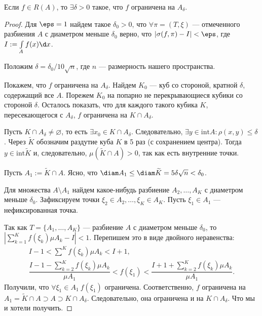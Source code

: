 \begin{Statement}
Если $f \in R(A)$, то $\exists \delta > 0$ такое, что $f$ ограничена на $A_\delta$.
\end{Statement}
\begin{proof}
Для $\eps = 1$ найдем такое $\delta_0 > 0$, что $\forall \pi = (T, \xi)$ --- отмеченного разбиения $A$ с диаметром меньше $\delta_0$ верно, что $|\sigma(f, \pi) - I | < \eps$, где $I := \int\limits_A f(x) \d x$.

Положим $\delta = \delta_0 / 10\sqrt{n}$, где $n$ --- размерность нашего пространства.

Покажем, что $f$ ограничена на $A_\delta$. Найдем $K_0$ --- куб со стороной, кратной $\delta$, содержащий все $A$. Порежем $K_0$ на попарно не перекрывающиеся кубики со стороной $\delta$. Осталось показать, что для каждого такого кубика $K$, пересекающегося с $A_\delta$, $f$ ограничена на $K \cap A_\delta$.

Пусть $K \cap A_\delta \neq \varnothing$, то есть $\exists x_0 \in K \cap A_\delta$. Следовательно, $\exists y \in \mathrm{int}A: \rho(x, y) \leq \delta$. Через $\widetilde{K}$ обозначим раздутие куба $K$ в 5 раз (с сохранением центра). Тогда $y \in \mathrm{int}\widetilde{K}$ и, следовательно, $\mu(\widetilde{K} \cap A) > 0$, так как есть внутренние точки.

Пусть $A_1 := \widetilde{K} \cap A$. Ясно, что $\diam A_1 \leq \diam \widetilde{K} = 5\delta \sqrt{n} < \delta_0$.

Для множества $A \setminus A_1$ найдем какое-нибудь разбиение $A_2, \ldots, A_K$ с диаметром меньше $\delta_0$. Зафиксируем точки $\xi_2 \in A_2, \ldots, \xi_K \in A_K$. Пусть $\xi_1 \in A_1$ --- нефиксированная точка.

Так как $T = \{ A_1, \ldots, A_K \}$ --- разбиение $A$ с диаметром меньше $\delta_0$, то $\left| \sum\limits_{k=1}^K f(\xi_k)\mu A_k - I\right| < 1$. Перепишем это в виде двойного неравенства:
\begin{gather*}
I - 1 < \sum\limits^K f(\xi_k)\mu A_k < I + 1,\\
\dfrac{I - 1 - \sum\limits_{k = 2}^Kf(\xi_k) \mu A_k }{\mu A_1} < f(\xi_1) < \dfrac{I + 1 + \sum\limits_{k = 2}^Kf(\xi_k) \mu A_k }{\mu A_1}.
\end{gather*}
Получили, что $\forall \xi_1 \in A_1\ f(\xi_1)$ ограничена. Соответственно, $f$ ограничена на $A_1 = \widetilde{K} \cap A \supset A \supset K \cap A_\delta$. Следовательно, она ограничена и на $K \cap A_\delta$. Что мы и хотели получить. 
\end{proof}



